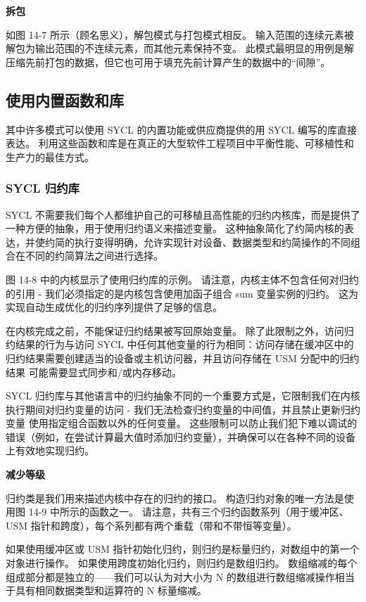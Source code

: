 \textbf{拆包}

如图 14-7 所示（顾名思义），解包模式与打包模式相反。 输入范围的连续元素被解包为输出范围的不连续元素，而其他元素保持不变。 此模式最明显的用例是解压缩先前打包的数据，但它也可用于填充先前计算产生的数据中的“间隙”。

\subsection{使用内置函数和库}
其中许多模式可以使用 SYCL 的内置功能或供应商提供的用 SYCL 编写的库直接表达。 利用这些函数和库是在真正的大型软件工程项目中平衡性能、可移植性和生产力的最佳方式。

\subsubsection{SYCL 归约库}
SYCL 不需要我们每个人都维护自己的可移植且高性能的归约内核库，而是提供了一种方便的抽象，用于使用归约语义来描述变量。 这种抽象简化了约简内核的表达，并使约简的执行变得明确，允许实现针对设备、数据类型和约简操作的不同组合在不同的约简算法之间进行选择。

图 14-8 中的内核显示了使用归约库的示例。 请注意，内核主体不包含任何对归约的引用 - 我们必须指定的是内核包含使用加函子组合 sum 变量实例的归约。 这为实现自动生成优化的归约序列提供了足够的信息。

在内核完成之前，不能保证归约结果被写回原始变量。 除了此限制之外，访问归约结果的行为与访问 SYCL 中任何其他变量的行为相同：访问存储在缓冲区中的归约结果需要创建适当的设备或主机访问器，并且访问存储在 USM 分配中的归约结果 可能需要显式同步和/或内存移动。

SYCL 归约库与其他语言中的归约抽象不同的一个重要方式是，它限制我们在内核执行期间对归约变量的访问 - 我们无法检查归约变量的中间值，并且禁止更新归约变量 使用指定组合函数以外的任何变量。 这些限制可以防止我们犯下难以调试的错误（例如，在尝试计算最大值时添加归约变量），并确保可以在各种不同的设备上有效地实现归约。

\textbf{减少等级}

归约类是我们用来描述内核中存在的归约的接口。 构造归约对象的唯一方法是使用图 14-9 中所示的函数之一。 请注意，共有三个归约函数系列（用于缓冲区、USM 指针和跨度），每个系列都有两个重载（带和不带恒等变量）。

如果使用缓冲区或 USM 指针初始化归约，则归约是标量归约，对数组中的第一个对象进行操作。 如果使用跨度初始化归约，则归约是数组归约。 数组缩减的每个组成部分都是独立的——我们可以认为对大小为 N 的数组进行数组缩减操作相当于具有相同数据类型和运算符的 N 标量缩减。

